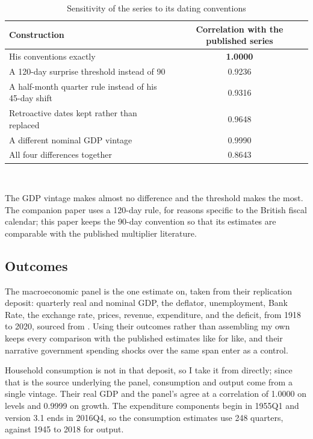 \documentclass[11pt,a4paper]{article}
\begin{document}
\begin{table}[htbp]
\centering
\caption{Sensitivity of the series to its dating conventions}
\label{tab:conv}
\begin{tabular}{lc}
\toprule
Construction & Correlation with the published series \\
\midrule
His conventions exactly & \textbf{1.0000} \\
A 120-day surprise threshold instead of 90 & 0.9236 \\
A half-month quarter rule instead of his 45-day shift & 0.9316 \\
Retroactive dates kept rather than replaced & 0.9648 \\
A different nominal GDP vintage & 0.9990 \\
\midrule
All four differences together & 0.8643 \\
\bottomrule
\end{tabular}
\\[4pt]
\begin{minipage}{0.86\textwidth}
\footnotesize The GDP vintage makes almost no difference and the threshold makes the most. The
companion paper uses a 120-day rule, for reasons specific to the British fiscal calendar; this paper
keeps the 90-day convention so that its estimates are comparable with the published multiplier
literature.
\end{minipage}
\end{table}

\subsection{Outcomes}

The macroeconomic panel is the one \citet{cloyne2025} estimate on, taken from their replication
deposit: quarterly real and nominal GDP, the deflator, unemployment, Bank Rate, the exchange rate,
prices, revenue, expenditure, and the deficit, from 1918 to 2020, sourced from \citet{thomas2017}.
Using their outcomes rather than assembling my own keeps every comparison with the published
estimates like for like, and their narrative government spending shocks over the same span enter as
a control.

Household consumption is not in that deposit, so I take it from \citet{thomas2017} directly; since
that is the source underlying the panel, consumption and output come from a single vintage. Their
real GDP and the panel's agree at a correlation of 1.0000 on levels and 0.9999 on growth. The
expenditure components begin in 1955Q1 and version 3.1 ends in 2016Q4, so the consumption estimates
use 248 quarters, against 1945 to 2018 for output.
\end{document}
